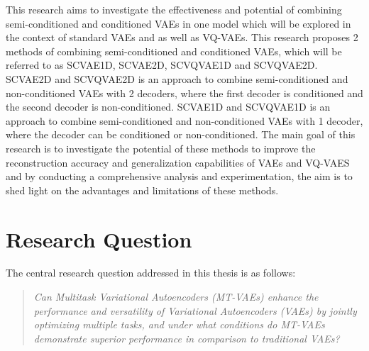 This research aims to investigate the effectiveness and potential of combining semi-conditioned and conditioned VAEs in one model which will be explored in the context of standard VAEs and as well as VQ-VAEs. This research proposes 2 methods of combining semi-conditioned and conditioned VAEs, which will be referred to as SCVAE1D, SCVAE2D, SCVQVAE1D and SCVQVAE2D. SCVAE2D and SCVQVAE2D is an approach to combine semi-conditioned and non-conditioned VAEs with 2 decoders, where the first decoder is conditioned and the second decoder is non-conditioned. SCVAE1D and SCVQVAE1D is an approach to combine semi-conditioned and non-conditioned VAEs with 1 decoder, where the decoder can be conditioned or non-conditioned. The main goal of this research is to investigate the potential of these methods to improve the reconstruction accuracy and generalization capabilities of VAEs and VQ-VAES and by conducting a comprehensive analysis and experimentation, the aim is to shed light on the advantages and limitations of these methods.

\section{Research Question}

The central research question addressed in this thesis is as follows:

\begin{quote}
\textit{Can Multitask Variational Autoencoders (MT-VAEs) enhance the performance and versatility of Variational Autoencoders (VAEs) by jointly optimizing multiple tasks, and under what conditions do MT-VAEs demonstrate superior performance in comparison to traditional VAEs?}
\end{quote}




